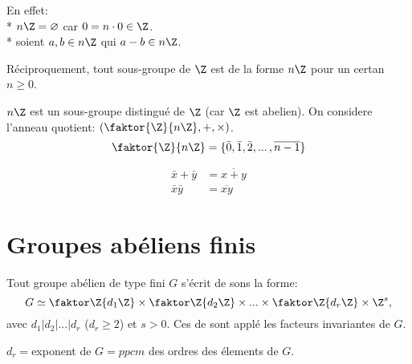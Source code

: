 En effet: \\
* $n\Z=\varnothing$ car $0=n\cdot 0\in\Z$.\\
* soient $a,b\in n\Z$ qui $a-b\in n\Z$. 

Réciproquement, tout sous-groupe de $\Z$ est de la forme $n\Z$ pour un certan $n\geq 0$.

$n\Z$ est un sous-groupe distingué de $\Z$ (car $\Z$ est abelien). On considere l'anneau quotient: $(\faktor{\Z}{n\Z}, +, \times)$.
$$\faktor{\Z}{n\Z}=\{\bar 0,\bar 1, \bar 2, ...\,, \overline{n-1}\}$$

\begin{align}
	\bar x+\bar y &= \overline{x+y}\\
	\bar x \bar y &= \overline{xy}
\end{align}

\section{Groupes abéliens finis}

\begin{theorem}
	Tout groupe abélien de type fini $G$ s'écrit de sons la forme:
	$$G\simeq \faktor\Z{d_1\Z} \times \faktor\Z{d_2\Z} \times ... \times \faktor\Z{d_r\Z} \times \Z^s,$$
	avec $d_1|d_2|...|d_r$ ($d_r\geq 2$) et $s>0$. Ces de sont applé les facteurs invariantes de $G$.
\end{theorem}
\begin{remark}
	$d_r = $exponent de $G = ppcm$ des ordres des élements de $G$. 
\end{remark}

